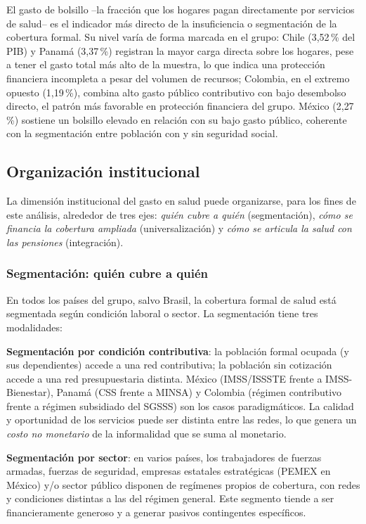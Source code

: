 \documentclass[12pt, letterpaper]{article}
\begin{document}
El gasto de bolsillo --la fracción que los hogares pagan directamente por servicios
de salud-- es el indicador más directo de la insuficiencia o segmentación de la
cobertura formal. Su nivel varía de forma marcada en el grupo: Chile (3{,}52\,\% del
PIB) y Panamá (3{,}37\,\%) registran la mayor carga directa sobre los hogares, pese a
tener el gasto total más alto de la muestra, lo que indica una protección financiera
incompleta a pesar del volumen de recursos; Colombia, en el extremo opuesto
(1{,}19\,\%), combina alto gasto público contributivo con bajo desembolso directo, el
patrón más favorable en protección financiera del grupo. México (2{,}27\,\%) sostiene
un bolsillo elevado en relación con su bajo gasto público, coherente con la
segmentación entre población con y sin seguridad social.

\subsection{Organización institucional}

La dimensión institucional del gasto en salud puede organizarse, para los fines de
este análisis, alrededor de tres ejes: \textit{quién cubre a quién} (segmentación),
\textit{cómo se financia la cobertura ampliada} (universalización) y
\textit{cómo se articula la salud con las pensiones} (integración).

\subsubsection{Segmentación: quién cubre a quién}

En todos los países del grupo, salvo Brasil, la cobertura formal de salud está
segmentada según condición laboral o sector. La segmentación tiene tres
modalidades:

\textbf{Segmentación por condición contributiva}: la población formal ocupada (y
sus dependientes) accede a una red contributiva; la población sin cotización
accede a una red presupuestaria distinta. México (IMSS/ISSSTE frente a IMSS-Bienestar),
Panamá (CSS frente a MINSA) y Colombia (régimen contributivo frente a régimen subsidiado del
SGSSS) son los casos paradigmáticos. La calidad y oportunidad de los servicios
puede ser distinta entre las redes, lo que genera un \textit{costo no monetario} de
la informalidad que se suma al monetario.

\textbf{Segmentación por sector}: en varios países, los trabajadores de
fuerzas armadas, fuerzas de seguridad, empresas estatales estratégicas (PEMEX en
México) y/o sector público disponen de regímenes propios de cobertura, con redes y
condiciones distintas a las del régimen general. Este segmento tiende a ser
financieramente generoso y a generar pasivos contingentes específicos.
\end{document}
